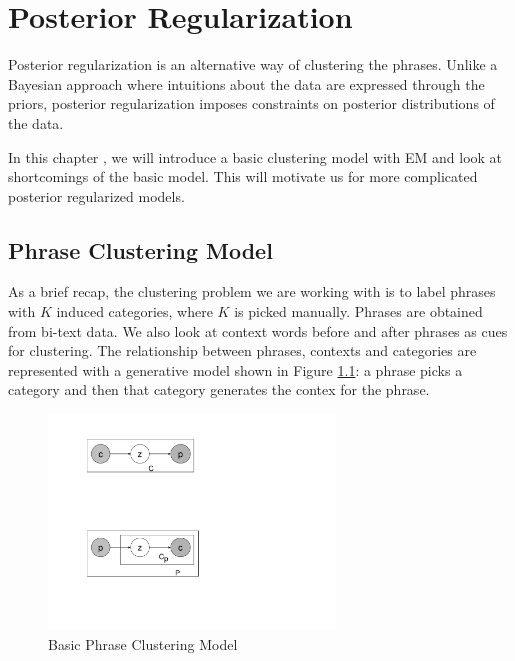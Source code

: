 \chapter{Posterior Regularization}
Posterior regularization is an alternative way of clustering the phrases.
Unlike a Bayesian approach where intuitions about the data are 
expressed through the priors, 
posterior regularization imposes constraints 
on posterior distributions of the data.

In this chapter , we will introduce a basic clustering model with EM 
and look at shortcomings of the basic model. This will motivate us for
more complicated posterior regularized models.
\section{Phrase Clustering Model} 
As a brief recap, the clustering problem we are working with
is to label phrases with $K$ induced categories, where
$K$ is picked manually.
Phrases are obtained from bi-text data.
We also look at context
 words before and after
phrases as cues for clustering.
The relationship between phrases, contexts and categories are
represented with a generative model shown in 
Figure \ref{fig:EM}: a phrase picks a 
category and then that category generates the contex for the phrase.

\begin{figure}[h]
  \centering
  \includegraphics[width=3.0in]{pr-clustering/EMdigram}
  \caption{Basic Phrase Clustering Model}
  \label{fig:EM}
\end{figure}

